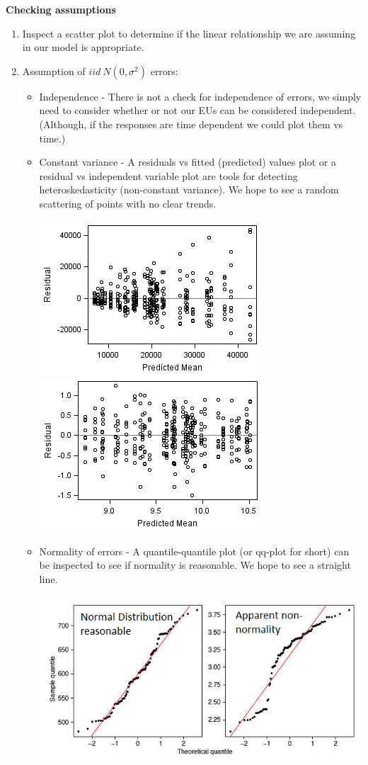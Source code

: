 \textbf{Checking assumptions}
\begin{enumerate}
\item Inspect a scatter plot to determine if the linear relationship we are assuming in our model is appropriate.
\item Assumption of $iid~N(0,\sigma^2)$ errors:
\begin{itemize}
\item Independence - There is not a check for independence of errors,  we simply need to consider whether or not our EUs can be considered independent. (Although, if the responses are time dependent we could plot them vs time.)
\item Constant variance - A residuals vs fitted (predicted) values plot or a residual vs independent variable plot are tools for detecting heteroskedasticity (non-constant variance).    We hope to see a random scattering of points with no clear trends.
\begin{center}
\includegraphics[scale=0.8]{hetero}\includegraphics[scale=0.9]{homo}
\end{center}
\item Normality of errors - A quantile-quantile plot (or qq-plot for short) can be inspected to see if normality is reasonable.  We hope to see a straight line.\\
\begin{center}
\includegraphics[scale=0.45]{qq}

\end{center}
\end{itemize}
\end{enumerate}
